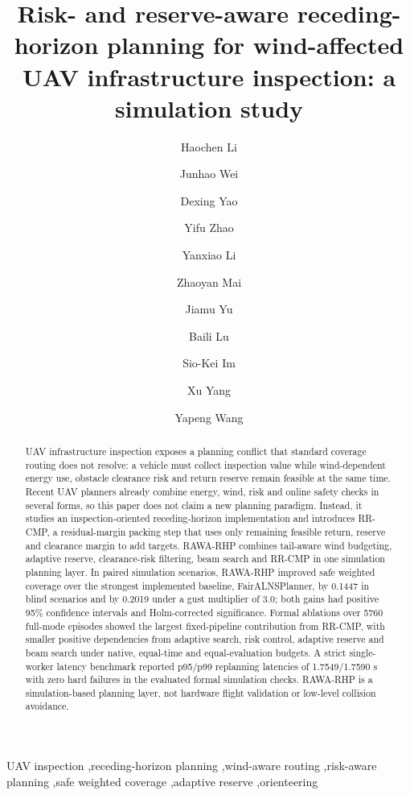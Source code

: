\documentclass[preprint,12pt]{elsarticle}
\begin{document}
\begin{frontmatter}

\title{Risk- and reserve-aware receding-horizon planning for wind-affected UAV infrastructure inspection: a simulation study}

\author[inst1]{Haochen Li}
\author[inst1,inst2]{Junhao Wei}
\author[inst1]{Dexing Yao}
\author[inst1]{Yifu Zhao}
\author[inst1]{Yanxiao Li}
\author[inst1]{Zhaoyan Mai}
\author[inst1]{Jiamu Yu}
\author[inst1]{Baili Lu}
\author[inst3]{Sio-Kei Im}
\author[inst1]{Xu Yang}
\author[inst1]{Yapeng Wang}

\begin{abstract}
UAV infrastructure inspection exposes a planning conflict that standard coverage routing does not resolve: a vehicle must collect inspection value while wind-dependent energy use, obstacle clearance risk and return reserve remain feasible at the same time. Recent UAV planners already combine energy, wind, risk and online safety checks in several forms, so this paper does not claim a new planning paradigm. Instead, it studies an inspection-oriented receding-horizon implementation and introduces RR-CMP, a residual-margin packing step that uses only remaining feasible return, reserve and clearance margin to add targets. RAWA-RHP combines tail-aware wind budgeting, adaptive reserve, clearance-risk filtering, beam search and RR-CMP in one simulation planning layer. In paired simulation scenarios, RAWA-RHP improved safe weighted coverage over the strongest implemented baseline, FairALNSPlanner, by 0.1447 in blind scenarios and by 0.2019 under a gust multiplier of 3.0; both gains had positive 95\% confidence intervals and Holm-corrected significance. Formal ablations over 5760 full-mode episodes showed the largest fixed-pipeline contribution from RR-CMP, with smaller positive dependencies from adaptive search, risk control, adaptive reserve and beam search under native, equal-time and equal-evaluation budgets. A strict single-worker latency benchmark reported p95/p99 replanning latencies of 1.7549/1.7590 s with zero hard failures in the evaluated formal simulation checks. RAWA-RHP is a simulation-based planning layer, not hardware flight validation or low-level collision avoidance.
\end{abstract}

\begin{keyword}
UAV inspection \sep receding-horizon planning \sep wind-aware routing \sep risk-aware planning \sep safe weighted coverage \sep adaptive reserve \sep orienteering
\end{keyword}

\end{frontmatter}
\end{document}
